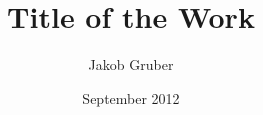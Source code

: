 
\title{Title of the Work}
\author{Jakob Gruber}
\address{Kirschenallee 6/1, A-2120 Obersdorf}
\date{September 2012}


